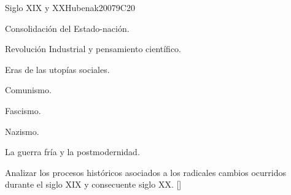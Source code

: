 \begin{syllabus}
\begin{unit}{}{Siglo XIX y XX}{Hubenak2007}{9}{C20}
\begin{topics}
	\item Consolidación del Estado-nación.
	\item Revolución Industrial y pensamiento cientí­fico.
	\item Eras de las utopí­as sociales.
	      \begin{subtopics}
		\item Comunismo.
		\item Fascismo.
		\item Nazismo.
	      \end{subtopics}
	\item La guerra frí­a y la postmodernidad.
\end{topics}
\begin{learningoutcomes}
	\item Analizar los procesos históricos asociados a los radicales cambios ocurridos durante el siglo XIX y consecuente siglo XX. [\Familiarity]
\end{learningoutcomes}
\end{unit}



\begin{coursebibliography}
\end{coursebibliography}

\end{syllabus}
